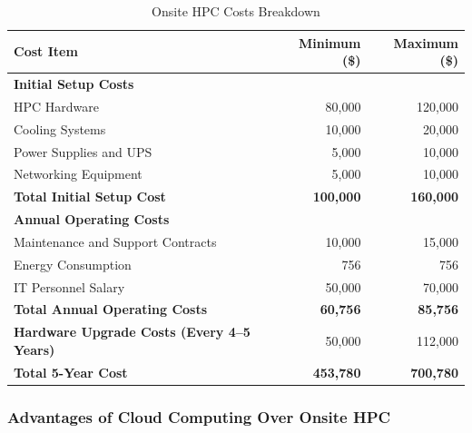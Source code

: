 \documentclass{article}
\begin{document}
\begin{table}[H]
    \centering
    \caption{Onsite HPC Costs Breakdown}
    \label{tab:hpc_costs}
    \begin{tabular}{lrr}
    \toprule
    \textbf{Cost Item} & \textbf{Minimum (\$)} & \textbf{Maximum (\$)} \\
    \midrule
    \textbf{Initial Setup Costs} & & \\
    \quad HPC Hardware & 80,000 & 120,000 \\
    \quad Cooling Systems & 10,000 & 20,000 \\
    \quad Power Supplies and UPS & 5,000 & 10,000 \\
    \quad Networking Equipment & 5,000 & 10,000 \\
    \textbf{Total Initial Setup Cost} & \textbf{100,000} & \textbf{160,000} \\
    \midrule
    \textbf{Annual Operating Costs} & & \\
    \quad Maintenance and Support Contracts & 10,000 & 15,000 \\
    \quad Energy Consumption & 756 & 756 \\
    \quad IT Personnel Salary & 50,000 & 70,000 \\
    \textbf{Total Annual Operating Costs} & \textbf{60,756} & \textbf{85,756} \\
    \midrule
    \textbf{Hardware Upgrade Costs (Every 4--5 Years)} & 50,000 & 112,000 \\
    \midrule
    \textbf{Total 5-Year Cost} & \textbf{453,780} & \textbf{700,780} \\
    \bottomrule
    \end{tabular}
    \end{table}

\subsubsection{Advantages of Cloud Computing Over Onsite HPC}
\end{document}
